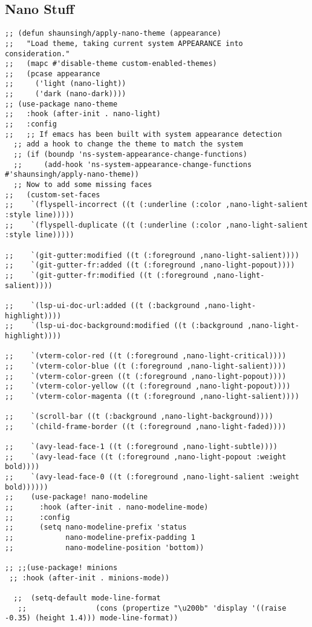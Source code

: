 \documentclass[11pt]{article}
\begin{document}
\subsection{Nano Stuff}
\label{sec:org712be30}
\begin{verbatim}
;; (defun shaunsingh/apply-nano-theme (appearance)
;;   "Load theme, taking current system APPEARANCE into consideration."
;;   (mapc #'disable-theme custom-enabled-themes)
;;   (pcase appearance
;;     ('light (nano-light))
;;     ('dark (nano-dark))))
;; (use-package nano-theme
;;   :hook (after-init . nano-light)
;;   :config
;;   ;; If emacs has been built with system appearance detection
  ;; add a hook to change the theme to match the system
  ;; (if (boundp 'ns-system-appearance-change-functions)
  ;;     (add-hook 'ns-system-appearance-change-functions #'shaunsingh/apply-nano-theme))
  ;; Now to add some missing faces
;;   (custom-set-faces
;;    `(flyspell-incorrect ((t (:underline (:color ,nano-light-salient :style line)))))
;;    `(flyspell-duplicate ((t (:underline (:color ,nano-light-salient :style line)))))

;;    `(git-gutter:modified ((t (:foreground ,nano-light-salient))))
;;    `(git-gutter-fr:added ((t (:foreground ,nano-light-popout))))
;;    `(git-gutter-fr:modified ((t (:foreground ,nano-light-salient))))

;;    `(lsp-ui-doc-url:added ((t (:background ,nano-light-highlight))))
;;    `(lsp-ui-doc-background:modified ((t (:background ,nano-light-highlight))))

;;    `(vterm-color-red ((t (:foreground ,nano-light-critical))))
;;    `(vterm-color-blue ((t (:foreground ,nano-light-salient))))
;;    `(vterm-color-green ((t (:foreground ,nano-light-popout))))
;;    `(vterm-color-yellow ((t (:foreground ,nano-light-popout))))
;;    `(vterm-color-magenta ((t (:foreground ,nano-light-salient))))

;;    `(scroll-bar ((t (:background ,nano-light-background))))
;;    `(child-frame-border ((t (:foreground ,nano-light-faded))))

;;    `(avy-lead-face-1 ((t (:foreground ,nano-light-subtle))))
;;    `(avy-lead-face ((t (:foreground ,nano-light-popout :weight bold))))
;;    `(avy-lead-face-0 ((t (:foreground ,nano-light-salient :weight bold))))))
;;    (use-package! nano-modeline
;;      :hook (after-init . nano-modeline-mode)
;;      :config
;;      (setq nano-modeline-prefix 'status
;;            nano-modeline-prefix-padding 1
;;            nano-modeline-position 'bottom))

;; ;;(use-package! minions
 ;; :hook (after-init . minions-mode))

  ;;  (setq-default mode-line-format
   ;;                (cons (propertize "\u200b" 'display '((raise -0.35) (height 1.4))) mode-line-format))
\end{verbatim}
\end{document}
